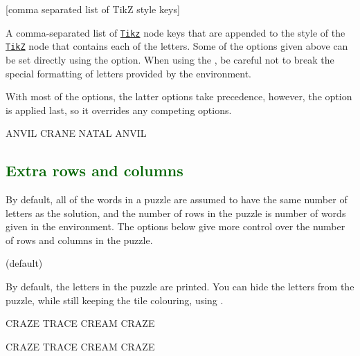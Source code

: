 \documentclass[svgnames]{report}
\newcommand\ctan[1]{\href{https://www.ctan.org/pkg/#1}{\texttt{#1}}}
\newcommand\Section[1]{\subsection{\textcolor{DarkGreen}{#1}}}
\begin{document}
  [comma separated list of TikZ style keys]

  A comma-separated list of \ctan{Tikz} node keys that are appended to
  the style of the \ctan{TikZ} node that contains each of the
   letters.  Some of the options given above can be set
  directly using the  option. When using the
  , be careful not to break the special formatting of
  letters provided by the  environment.\par

  With most of the  options, the latter options take
  precedence, however, the  option is applied last,
  so it overrides any competing options.

  \begin{example}
  \begin{wordle}[tile style={rotate=45}]{ANVIL}
    CRANE
    NATAL
    ANVIL
  \end{wordle}
  \end{example}

  \Section{Extra rows and columns}

  By default, all of the words in a  puzzle are assumed
  to have the same number of letters as the solution, and the number of
  rows in the puzzle is number of words given in the environment. The
  options below give more control over the number of rows and columns in
  the puzzle.

   (default)\qquad

  By default, the letters in the puzzle are printed. You can hide the
  letters from the puzzle, while still keeping the  tile
  colouring, using .

  \begin{example}
  \begin{wordle}[letters]{CRAZE} %
    TRACE
    CREAM
    CRAZE
  \end{wordle}
  \end{example}

  \begin{example}
  \begin{wordle}[noletters]{CRAZE}
    TRACE
    CREAM
    CRAZE
  \end{wordle}
  \end{example}
\end{document}

